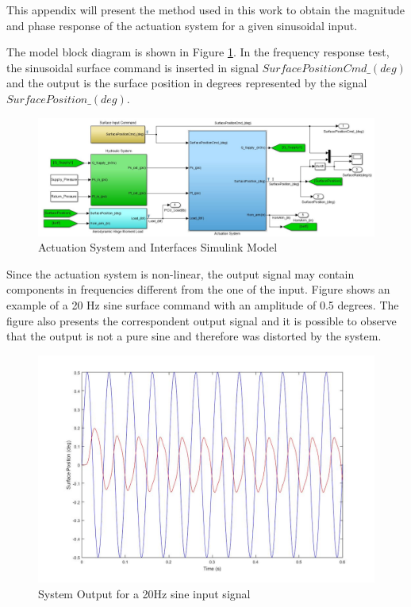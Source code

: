 
This appendix will present the method used in this work to obtain the magnitude and phase response of the actuation system for a given sinusoidal input.

The model block diagram is shown in Figure \ref{fig:B_SimulinkModel}. In the frequency response test, the sinusoidal surface command is inserted in signal \textit{$SurfacePositionCmd\_(deg)$} and the output is the surface position in degrees represented by the signal \textit{$SurfacePosition\_(deg)$}.

\begin{figure}[H]
	\centering
	\centerline{\includegraphics[width=1.1\textwidth]{Figuras/3.ActuationSystemModel/3-Model.jpg}}
	\caption{Actuation System and Interfaces Simulink Model}
	\label{fig:B_SimulinkModel}
\end{figure}

Since the actuation system is non-linear, the output signal may contain components in frequencies different from the one of the input. Figure   shows an example of a 20 Hz sine surface command with an amplitude of 0.5 degrees. The figure also presents the correspondent output signal and it is possible to observe that the output is not a pure sine and therefore was distorted by the system. 

\begin{figure}[H]
	\centering
	\centerline{\includegraphics[width=1.1\textwidth]{Figuras/B.NonlinearFR/20HzTimeResponse.jpg}}
	\caption{System Output for a 20Hz sine input signal}
	\label{fig:B_InputOutput}
\end{figure}

